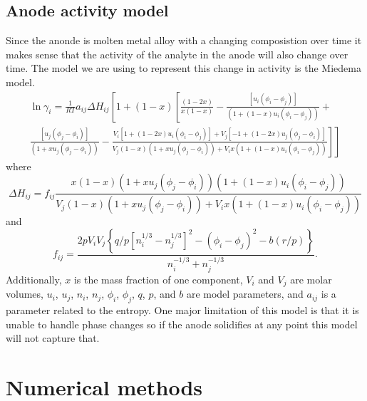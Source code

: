 \documentclass[journal=mamobx, layout=twocolumn]{achemso}
\begin{document}
\subsection{Anode activity model} \label{sec:activity}
Since the anonde is molten metal alloy with a changing composistion over time it makes sense that the activity of the analyte in the anode will also change over time.
The model we are using to represent this change in activity is the Miedema model\cite{Miedema1980}.
\begin{multline}
        \ln\gamma_i = \frac{1}{RT}a_{ij}\Delta H_{ij}\left[1 + (1-x)\left[\frac{\left(1 - 2x\right)}{x\left(1-x\right)} -
\frac{\left[u_{i} \left({\phi}_{i} - {\phi}_{j}\right)\right]}{\left(1 + \left(1 - x\right)u_{i} \left({\phi}_{i} - {\phi}_{j}\right)\right)} + \right. \right.\\
\left. \left. \frac{\left[u_{j} \left({\phi}_{j} - {\phi}_{i}\right)\right]}{\left(1 + xu_{j} \left({\phi}_{j} - {\phi}_{i}\right)\right)} - 
\frac{V_{i} \left[1 + \left(1 - 2x\right)u_{i} \left({\phi}_{i} - {\phi}_{j}\right)  \right]+ V_{j}\left[-1 + \left(1 - 2x\right)u_{j} \left({\phi}_{j} - {\phi}_{i}\right)\right]} 
 {V_{j} \left(1 - x\right) \left(1 + xu_{j} \left({\phi}_{j} - {\phi}_{i}\right)\right) + V_{i}x \left(1 + \left(1 - x\right)u_{i} \left({\phi}_{i} - {\phi}_{j}\right) \right)}\right]\right]
\end{multline}
where 
\begin{equation}
    \Delta H_{ij} = f_{ij}\frac{x\left(1-x\right)\left(1 + xu_{j} \left({\phi}_{j} - {\phi}_{i}\right)\right)\left(1 + \left(1 - x\right)u_{i} \left({\phi}_{i} - {\phi}_{j}\right)\right)}{V_{j} \left(1 - x\right) \left(1 + xu_{j} \left({\phi}_{j} - {\phi}_{i}\right)\right) + V_{i}x \left(1 + \left(1 - x\right)u_{i} \left({\phi}_{i} - {\phi}_{j}\right) \right)}
\end{equation}
and
\begin{equation}
f_{ij} = \frac{2pV_iV_j\left \{q/p\left[n^{1/3}_i - n^{1/3}_j\right]^2-\left(\phi_i-\phi_j\right)^2-b(r/p)\right\}}{n^{-1/3}_i + n^{-1/3}_j}.
\end{equation}
Additionally, $x$ is the mass fraction of one component, $V_i$ and $V_j$ are molar volumes, $u_i$, $u_j$, $n_i$, $n_j$, $\phi_i$, $\phi_j$, $q$, $p$, and $b$ are model parameters, and $a_{ij}$ is a parameter related to the entropy.
One major limitation of this model is that it is unable to handle phase changes so if the anode solidifies at any point this model will not capture that. 
\section{Numerical methods}
\end{document}
